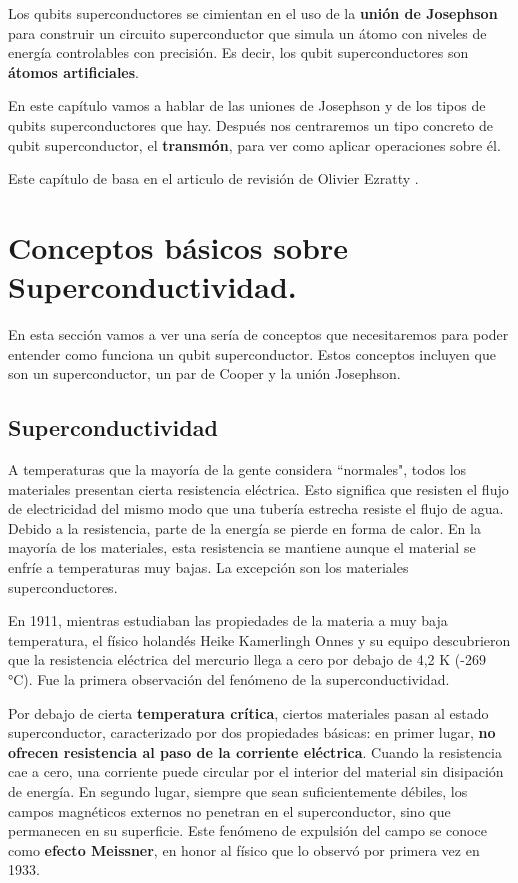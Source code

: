 Los qubits superconductores se cimientan en el uso de la \textbf{unión de Josephson} para construir un circuito superconductor que simula un átomo con niveles de energía controlables con precisión. Es decir, los qubit superconductores son \textbf{átomos artificiales}.

En este capítulo vamos a hablar de las uniones de Josephson y de los tipos de qubits superconductores que hay. Después nos centraremos un tipo concreto de qubit superconductor, el \textbf{transmón}, para ver como aplicar operaciones sobre él.

Este capítulo de basa en el articulo de revisión de Olivier Ezratty \cite{bib_scq_ezratty2023perspective}.


\section{Conceptos básicos sobre Superconductividad.}

En esta sección vamos a ver una sería de conceptos que necesitaremos para poder entender como funciona un qubit superconductor. Estos conceptos incluyen que son un superconductor, un par de Cooper y la unión Josephson.


\subsection{Superconductividad}


A temperaturas que la mayoría de la gente considera ``normales", todos los materiales presentan cierta resistencia eléctrica. Esto significa que resisten el flujo de electricidad del mismo modo que una tubería estrecha resiste el flujo de agua. Debido a la resistencia, parte de la energía se pierde en forma de calor. En la mayoría de los materiales, esta resistencia se mantiene aunque el material se enfríe a temperaturas muy bajas. La excepción son los materiales superconductores.

En 1911, mientras estudiaban las propiedades de la materia a muy baja temperatura, el físico holandés Heike Kamerlingh Onnes y su equipo descubrieron que la resistencia eléctrica del mercurio llega a cero por debajo de 4,2 K (-269 °C).  Fue la primera observación del fenómeno de la superconductividad.  

Por debajo de cierta \textbf{temperatura crítica}, ciertos materiales pasan al estado superconductor, caracterizado por dos propiedades básicas: en primer lugar, \textbf{no ofrecen resistencia al paso de la corriente eléctrica}. Cuando la resistencia cae a cero, una corriente puede circular por el interior del material sin disipación de energía. En segundo lugar, siempre que sean suficientemente débiles, los campos magnéticos externos no penetran en el superconductor, sino que permanecen en su superficie. Este fenómeno de expulsión del campo se conoce como \textbf{efecto Meissner}, en honor al físico que lo observó por primera vez en 1933.

